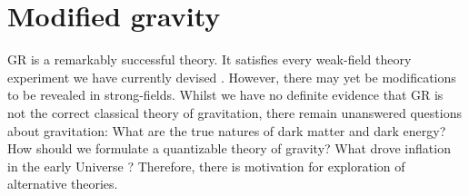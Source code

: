 

\section{Modified gravity}

GR is a remarkably successful theory. It satisfies every weak-field theory experiment we have currently devised \citep{Will2006}. However, there may yet be modifications to be revealed in strong-fields. Whilst we have no definite evidence that GR is not the correct classical theory of gravitation, there remain unanswered questions about gravitation: What are the true natures of dark matter and dark energy? How should we formulate a quantizable theory of gravity? What drove inflation in the early Universe \citep{Guth1981,Lyth1999}? Therefore, there is motivation for exploration of alternative theories.

